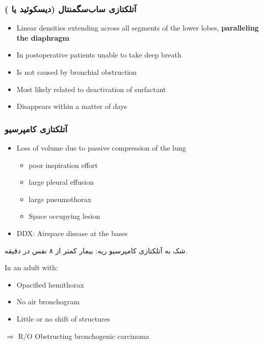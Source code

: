 \documentclass[11pt,a4paper]{article}
\providecommand{\en}[1]{\lr{#1}}
\begin{document}
\subsubsection*{\en{a)} آتلکتازی ساب‌سگمنتال (دیسکوئید یا \en{plate-like})}
\begin{latin}
\begin{itemize}
\item Linear densities extending across all segments of the lower lobes, \textbf{paralleling the diaphragm}
\item In postoperative patients unable to take deep breath
\item Is not caused by bronchial obstruction
\item Most likely related to deactivation of surfactant
\item Disappears within a matter of days
\end{itemize}
\end{latin}

\subsubsection*{\en{b)} آتلکتازی کامپرسیو}
\begin{latin}
\begin{itemize}
\item Loss of volume due to passive compression of the lung
  \begin{itemize}
  \item poor inspiration effort
  \item large pleural effusion
  \item large pneumothorax
  \item Space occupying lesion
  \end{itemize}
\item DDX: Airspace disease at the bases
\end{itemize}
\end{latin}
شک به آتلکتازی کامپرسیو ریه: بیمار کمتر از ۸ نفس در دقیقه.
\begin{latin}
\noindent In an adult with:
\begin{itemize}
\item Opacified hemithorax
\item No air bronchogram
\item Little or no shift of structures
\end{itemize}
\noindent $\Longrightarrow$ R/O Obstructing bronchogenic carcinoma
\end{latin}
\end{document}
